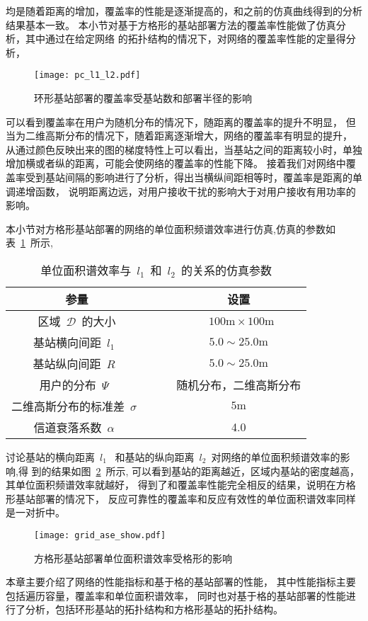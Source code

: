 均是随着距离的增加，覆盖率的性能是逐渐提高的，和之前的仿真曲线得到的分析结果基本一致。
本小节对基于方格形的基站部署方法的覆盖率性能做了仿真分析，其中通过在给定网络
的拓扑结构的情况下，对网络的覆盖率性能的定量得分析，
\begin{figure}[htbp]
\centering
\texttt{[image: pc\_l1\_l2.pdf]}
\caption{环形基站部署的覆盖率受基站数和部署半径的影响}\vspace{-0.5em}
\label{pc_l1_l2}
\end{figure}
可以看到覆盖率在用户为随机分布的情况下，随距离的覆盖率的提升不明显，
但当为二维高斯分布的情况下，随着距离逐渐增大，网络的覆盖率有明显的提升，
从通过颜色反映出来的图的梯度特性上可以看出，当基站之间的距离较小时，单独增加横或者纵的距离，可能会使网络的覆盖率的性能下降。
接着我们对网络中覆盖率受到基站间隔的影响进行了分析，得出当横纵间距相等时，覆盖率是距离的单调递增函数，
说明距离边远，对用户接收干扰的影响大于对用户接收有用功率的影响。



本小节对方格形基站部署的网络的单位面积频谱效率进行仿真,仿真的参数如
表~\ref{grid_ase_param}~所示,
\begin{table}[htbp]
\caption{单位面积谱效率与~$l_1$~和~$l_2$~的关系的仿真参数}
\label{grid_ase_param}
\vspace{0.5em}\centering\wuhao
\begin{tabular}{cccc}
\toprule[1.5pt]
参量 & & & 设置 \\
\midrule[0.5pt]
区域~$\mathcal{D}$~的大小  & & & ~$100\mathrm{m} \times 100 \mathrm{m}$ \\
基站横向间距~$l_1$~ & & &  $5.0\sim 25.0\mathrm{m}$\\
基站纵向间距~$R$~ & & &  $5.0\sim 25.0\mathrm{m}$\\
用户的分布~$\Psi$~ & & & 随机分布，二维高斯分布\\
二维高斯分布的标准差~$\sigma$~ & & & ${5\mathrm{m}}$\\
信道衰落系数~$\alpha$~  & & & 4.0\\
\bottomrule[1.5pt]
\end{tabular}
\end{table}
讨论基站的横向距离~$l_1$~ 和基站的纵向距离~$l_2$~对网络的单位面积频谱效率的影响,得
到的结果如图~\ref{grid_ase_show}~所示,
可以看到基站的距离越近，区域内基站的密度越高，其单位面积频谱效率就越好，
得到了和覆盖率性能完全相反的结果，说明在方格形基站部署的情况下，
反应可靠性的覆盖率和反应有效性的单位面积谱效率同样是一对折中。
\begin{figure}[htbp]
\centering
\texttt{[image: grid\_ase\_show.pdf]}
\caption{方格形基站部署单位面积谱效率受格形的影响}\vspace{-0.5em}
\label{grid_ase_show}
\end{figure}

本章主要介绍了网络的性能指标和基于格的基站部署的性能，
其中性能指标主要包括遍历容量，覆盖率和单位面积谱效率，
同时也对基于格的基站部署的性能进行了分析，包括环形基站的拓扑结构和方格形基站的拓扑结构。

